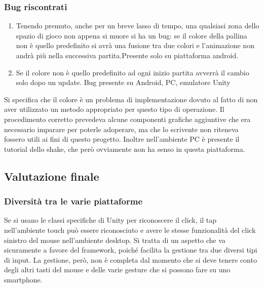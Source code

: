 \subsubsection{Bug riscontrati}
\begin{enumerate}
\item Tenendo premuto, anche per un breve lasso di tempo, una qualsiasi zona dello spazio di gioco non appena si muore si ha un bug: se il colore della pallina non è quello predefinito si avrà una fusione tra due colori e l’animazione non andrà più nella successiva partita.Presente solo su piattaforma android.
\item Se il colore non è quello predefinito ad ogni inizio partita avverrà il cambio solo dopo un update. Bug presente su Android, PC, emulatore Unity
\end{enumerate}

Si specifica che il colore è un problema di implementazione dovuto al fatto di non aver utilizzato un metodo appropriato per questo tipo di operazione. Il procedimento corretto prevedeva alcune componenti grafiche aggiuntive che era necessario imparare per poterle adoperare, ma che lo scrivente non riteneva fossero utili ai fini di questo progetto. Inoltre nell’ambiente PC è presente il tutorial dello shake, che però ovviamente non ha senso in questa piattaforma.



\subsection{Valutazione finale}

\subsubsection{Diversità tra le varie piattaforme}
Se si usano le classi specifiche di Unity per riconoscere il click, il tap nell’ambiente touch può essere riconosciuto e avere le stesse funzionalità del click sinistro del mouse nell’ambiente desktop. Si tratta di un aspetto che va sicuramente a favore del framework, poiché facilita la gestione tra due diversi tipi di input. La gestione, però, non è completa dal momento che si deve tenere conto degli altri tasti del mouse e delle varie gesture che si possono fare su uno smartphone.

